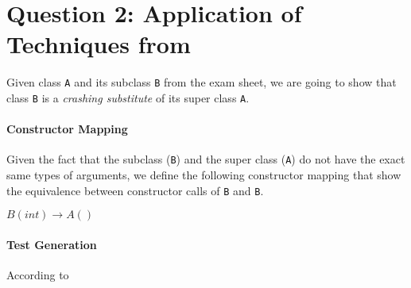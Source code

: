 \section*{Question 2: Application of Techniques from \cite{Pradel:2013:ATS}}

\newcommand{\myA}{\texttt{A}}
\newcommand{\myB}{\texttt{B}}

Given class \myA{} and its subclass \myB{} from the exam
sheet, we are going to show that class \myB{} is a
\textit{crashing substitute} of its super class \myA{}.

\paragraph*{Constructor Mapping}
Given the fact that the subclass (\myB{}) and the super
class (\myA{}) do not have the exact same types of arguments,
we define the following constructor mapping that show the
equivalence between constructor calls of \myB{} and \myB{}.

$\mathit{B}(int) \rightarrow \mathit{A}()$

\paragraph*{Test Generation}
According to 